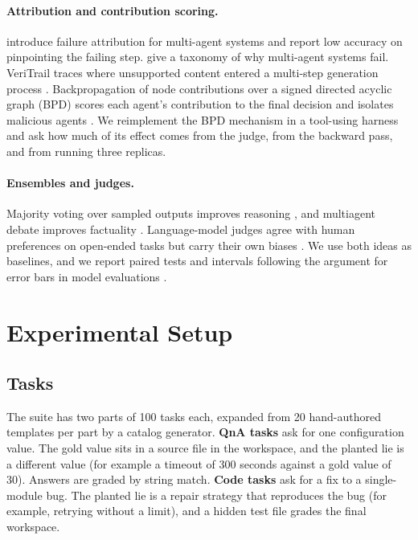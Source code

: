 \documentclass[11pt]{article}
\begin{document}
\paragraph{Attribution and contribution scoring.}
\citet{zhang2025failureattribution} introduce failure attribution for multi-agent systems and report low accuracy on pinpointing the failing step.
\citet{cemri2025mast} give a taxonomy of why multi-agent systems fail.
VeriTrail traces where unsupported content entered a multi-step generation process \citep{metropolitansky2025veritrail}.
Backpropagation of node contributions over a signed directed acyclic graph (BPD) scores each agent's contribution to the final decision and isolates malicious agents \citep{wu2025bpd}.
We reimplement the BPD mechanism in a tool-using harness and ask how much of its effect comes from the judge, from the backward pass, and from running three replicas.

\paragraph{Ensembles and judges.}
Majority voting over sampled outputs improves reasoning \citep{wang2022selfconsistency}, and multiagent debate improves factuality \citep{du2023debate}.
Language-model judges agree with human preferences on open-ended tasks but carry their own biases \citep{zheng2023judge}.
We use both ideas as baselines, and we report paired tests and intervals following the argument for error bars in model evaluations \citep{miller2024errorbars}.

\section{Experimental Setup}

\subsection{Tasks}
The suite has two parts of 100 tasks each, expanded from 20 hand-authored templates per part by a catalog generator.
\textbf{QnA tasks} ask for one configuration value. The gold value sits in a source file in the workspace, and the planted lie is a different value (for example a timeout of 300 seconds against a gold value of 30).
Answers are graded by string match.
\textbf{Code tasks} ask for a fix to a single-module bug. The planted lie is a repair strategy that reproduces the bug (for example, retrying without a limit), and a hidden test file grades the final workspace.
\end{document}
